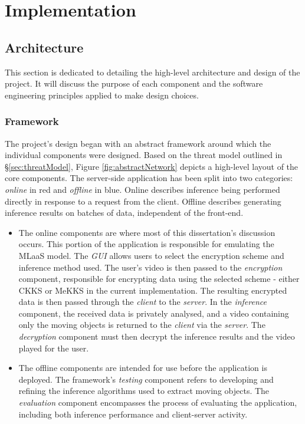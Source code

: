 \chapter{Implementation}
\label{chap:implementation}


\section{Architecture}
\setlength{\leftskip}{0.25cm}
\indent \indent
This section is dedicated to detailing the high-level architecture and design of the project. It will discuss the purpose of each component and the software engineering principles applied to make design choices.

\setlength{\leftskip}{0cm}
\subsection{Framework}
\setlength{\leftskip}{0.5cm}
\indent \indent
The project's design began with an abstract framework around which the individual components were designed. Based on the threat model outlined in §\ref{sec:threatModel}, Figure \ref{fig:abstractNetwork} depicts a high-level layout of the core components. The server-side application has been split into two categories: \textit{online} in red and \textit{offline} in blue. Online describes inference being performed directly in response to a request from the client. Offline describes generating inference results on batches of data, independent of the front-end. 
\begin{itemize}
    \item The online components are where most of this dissertation's discussion occurs. This portion of the application is responsible for emulating the MLaaS model. The \textit{GUI} allows users to select the encryption scheme and inference method used. The user's video is then passed to the \textit{encryption} component, responsible for encrypting data using the selected scheme - either CKKS or MeKKS in the current implementation. The resulting encrypted data is then passed through the \textit{client} to the \textit{server}. In the \textit{inference} component, the received data is privately analysed, and a video containing only the moving objects is returned to the \textit{client} via the \textit{server}. The \textit{decryption} component must then decrypt the inference results and the video played for the user.
    \item The offline components are intended for use before the application is deployed. The framework's \textit{testing} component refers to developing and refining the inference algorithms used to extract moving objects. The \textit{evaluation} component encompasses the process of evaluating the application, including both inference performance and client-server activity.
\end{itemize}
